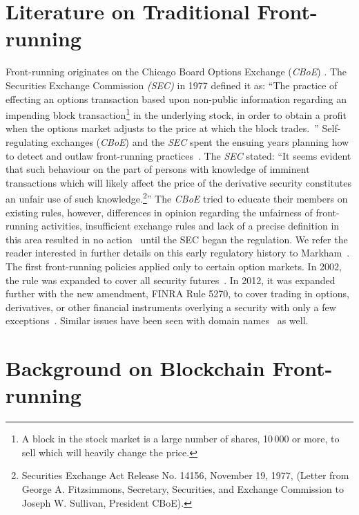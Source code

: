 \section{Literature on Traditional Front-running}\label{traditionalFrontrunning}
Front-running originates on the Chicago Board Options Exchange (\textit{CBoE}) \cite{markham1988front}. The Securities Exchange Commission \textit{(SEC)} in 1977 defined it as: ``The practice of effecting an options transaction based upon non-public information regarding an impending block transaction\footnote{A block in the stock market is a large number of shares, 10\,000 or more, to sell which will heavily change the price.} in the underlying stock, in order to obtain a profit when the options market adjusts to the price at which the block trades.~\cite{sec1978optionsmarket}'' Self-regulating exchanges (\eg \textit{CBoE}) and the \textit{SEC} spent the ensuing years planning how to detect and outlaw front-running practices~\cite{markham1988front}. The \textit{SEC} stated: ``It seems evident that such behaviour on the part of persons with knowledge of imminent transactions which will likely affect the price of the derivative security constitutes an unfair use of such knowledge.\footnote{Securities Exchange Act Release No. 14156, November 19, 1977, (Letter from George A. Fitzsimmons, Secretary, Securities, and Exchange Commission to Joseph W. Sullivan, President  CBoE).}'' The \textit{CBoE} tried to educate their members on existing rules, however, differences in opinion regarding the unfairness of front-running activities, insufficient exchange rules and lack of a precise definition in this area resulted in no action~\cite{sec1978optionsmarket} until the SEC began the regulation. We refer the reader interested in further details on this early regulatory history to Markham~\cite{markham1988front}. The first front-running policies applied only to certain option markets. In 2002, the rule was expanded to cover all security futures~\cite{finra_2002}. In 2012, it was expanded further with the new amendment, FINRA Rule 5270, to cover trading in options, derivatives, or other financial instruments overlying a security with only a few exceptions~\cite{sec2012frontrunning,finra_2012}. Similar issues have been seen with domain names~\cite{sac022en33:online,edelman2009front} as well.


\section{Background on Blockchain Front-running} \label{sec:Front Running on the Blockchains}


